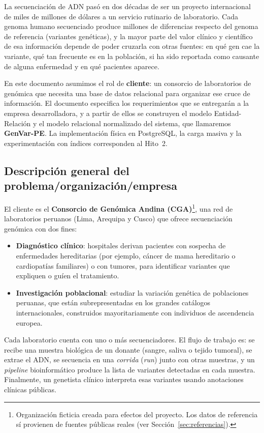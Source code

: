 \documentclass[11pt,a4paper]{article}
\begin{document}
La secuenciación de ADN pasó en dos décadas de ser un proyecto internacional de miles de millones de dólares a un servicio rutinario de laboratorio. Cada genoma humano secuenciado produce millones de diferencias respecto del genoma de referencia (variantes genéticas), y la mayor parte del valor clínico y científico de esa información depende de poder cruzarla con otras fuentes: en qué gen cae la variante, qué tan frecuente es en la población, si ha sido reportada como causante de alguna enfermedad y en qué pacientes aparece.

En este documento asumimos el rol de \textbf{cliente}: un consorcio de laboratorios de genómica que necesita una base de datos relacional para organizar ese cruce de información. El documento especifica los requerimientos que se entregarán a la empresa desarrolladora, y a partir de ellos se construyen el modelo Entidad-Relación y el modelo relacional normalizado del sistema, que llamaremos \textbf{GenVar-PE}. La implementación física en PostgreSQL, la carga masiva y la experimentación con índices corresponden al Hito~2.

\subsection{Descripción general del problema/organización/empresa}

El cliente es el \textbf{Consorcio de Genómica Andina (CGA)}\footnote{Organización ficticia creada para efectos del proyecto. Los datos de referencia sí provienen de fuentes públicas reales (ver Sección~\ref{sec:referencias}).}, una red de laboratorios peruanos (Lima, Arequipa y Cusco) que ofrece secuenciación genómica con dos fines:

\begin{itemize}
  \item \textbf{Diagnóstico clínico}: hospitales derivan pacientes con sospecha de enfermedades hereditarias (por ejemplo, cáncer de mama hereditario o cardiopatías familiares) o con tumores, para identificar variantes que expliquen o guíen el tratamiento.
  \item \textbf{Investigación poblacional}: estudiar la variación genética de poblaciones peruanas, que están subrepresentadas en los grandes catálogos internacionales, construidos mayoritariamente con individuos de ascendencia europea.
\end{itemize}

Cada laboratorio cuenta con uno o más secuenciadores. El flujo de trabajo es: se recibe una muestra biológica de un donante (sangre, saliva o tejido tumoral), se extrae el ADN, se secuencia en una \emph{corrida} (\emph{run}) junto con otras muestras, y un \emph{pipeline} bioinformático produce la lista de variantes detectadas en cada muestra. Finalmente, un genetista clínico interpreta esas variantes usando anotaciones clínicas públicas.
\end{document}
